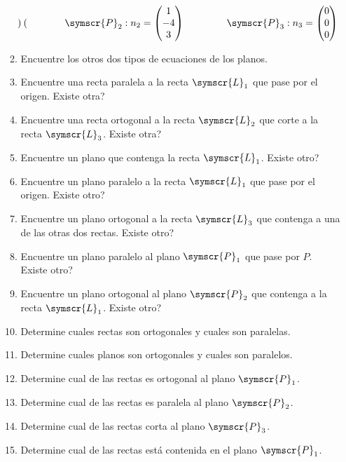 \documentclass{article}
\def\fancyL{\symscr{L}}
\def\fancyP{\symscr{P}}
\begin{document}
\begin{enumerate}
\begin{enumerate}[label=\listAlph]
\[\begin{pmatrix}
                \end{pmatrix}
                \hspace{1.5cm}
                \fancyP_2:
                n_2 = \begin{pmatrix}
                    1 \\ -4 \\ 3
                \end{pmatrix}
                \hspace{1.5cm}
                \fancyP_3:
                n_3 = \begin{pmatrix}
                    0 \\ 0 \\ 0
                \end{pmatrix}
            \]
		\item Encuentre los otros dos tipos de ecuaciones de los planos.
        \item Encuentre una recta paralela a la recta \(\fancyL_1\) que pase por el origen. Existe otra?
        \item Encuentre una recta ortogonal a la recta \(\fancyL_2\) que corte a la recta \(\fancyL_3\). Existe otra?
        \item Encuentre un plano que contenga la recta \(\fancyL_1\). Existe otro?
        \item Encuentre un plano paralelo a la recta \(\fancyL_1\) que pase por el origen. Existe otro?
        \item Encuentre un plano ortogonal a la recta \(\fancyL_3\) que contenga a una de las otras dos rectas. Existe otro?
		\item Encuentre un plano paralelo al plano \(\fancyP_1\) que pase por \(P\). Existe otro?
		\item Encuentre un plano ortogonal al plano \(\fancyP_2\) que contenga a la recta \(\fancyL_1\). Existe otro?
		\item Determine cuales rectas son ortogonales y cuales son paralelas.
		\item Determine cuales planos son ortogonales y cuales son paralelos.
		\item Determine cual de las rectas es ortogonal al plano \(\fancyP_1\).
		\item Determine cual de las rectas es paralela al plano \(\fancyP_2\).
		\item Determine cual de las rectas corta al plano \(\fancyP_3\).
		\item Determine cual de las rectas está contenida en el plano \(\fancyP_1\).

\end{enumerate}
\end{enumerate}
\end{document}
